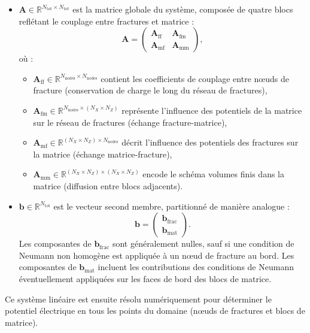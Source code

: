 \begin{itemize}[label = \textbullet]
    \item $\mathbf{A}\in\mathbb{R}^{N_{\text{tot}}\times N_{\text{tot}}}$ est la matrice globale du système, composée de quatre blocs reflétant le couplage entre fractures et matrice :
    \begin{equation}
    \mathbf{A} = \begin{pmatrix}
    \mathbf{A}_{\text{ff}} & \mathbf{A}_{\text{fm}} \\
    \mathbf{A}_{\text{mf}} & \mathbf{A}_{\text{mm}}
    \end{pmatrix},
    \label{eq:matrix_structure}
    \end{equation}
    où :
    \begin{itemize}
        \item $\mathbf{A}_{\text{ff}}\in\mathbb{R}^{N_{\text{nodes}}\times N_{\text{nodes}}}$ contient les coefficients de couplage entre nœuds de fracture (conservation de charge le long du réseau de fractures),
        \item $\mathbf{A}_{\text{fm}}\in\mathbb{R}^{N_{\text{nodes}}\times (N_X\times N_Z)}$ représente l'influence des potentiels de la matrice sur le réseau de fractures (échange fracture-matrice),
        \item $\mathbf{A}_{\text{mf}}\in\mathbb{R}^{(N_X\times N_Z)\times N_{\text{nodes}}}$ décrit l'influence des potentiels des fractures sur la matrice (échange matrice-fracture),
        \item $\mathbf{A}_{\text{mm}}\in\mathbb{R}^{(N_X\times N_Z)\times (N_X\times N_Z)}$ encode le schéma volumes finis dans la matrice (diffusion entre blocs adjacents).
    \end{itemize}
    
    \item $\mathbf{b}\in\mathbb{R}^{N_{\text{tot}}}$ est le vecteur second membre, partitionné de manière analogue :
    $$\mathbf{b} = \begin{pmatrix} \mathbf{b}_{\text{frac}} \\ \mathbf{b}_{\text{mat}} \end{pmatrix}.$$
    Les composantes de $\mathbf{b}_{\text{frac}}$ sont généralement nulles, sauf si une condition de Neumann non homogène est appliquée à un nœud de fracture au bord. Les composantes de $\mathbf{b}_{\text{mat}}$ incluent les contributions des conditions de Neumann éventuellement appliquées sur les faces de bord des blocs de matrice.
\end{itemize}

Ce système linéaire est ensuite résolu numériquement pour déterminer le potentiel électrique en tous les points du domaine (nœuds de fractures et blocs de matrice).
